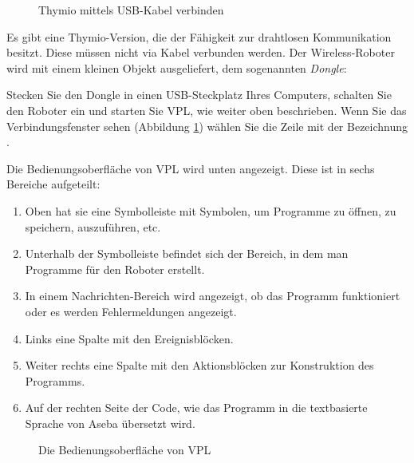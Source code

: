 
\begin{figure} 
\begin{center}
\caption{Thymio mittels USB-Kabel verbinden}\label{fig.connect}
\end{center}
\end{figure}


Es gibt eine Thymio-Version, die der Fähigkeit zur drahtlosen Kommunikation besitzt. Diese müssen nicht via Kabel verbunden werden. Der Wireless-Roboter wird mit einem kleinen Objekt ausgeliefert, dem sogenannten \emph{Dongle}:


Stecken Sie den Dongle in einen USB-Steckplatz Ihres Computers, schalten Sie den Roboter ein und starten Sie VPL, wie weiter oben beschrieben. Wenn Sie das Verbindungsfenster sehen (Abbildung \ref{fig.connect}) wählen Sie die Zeile mit der Bezeichnung .



Die Bedienungsoberfläche von VPL wird unten angezeigt. Diese ist in sechs
Bereiche aufgeteilt:
\begin{enumerate}
\item Oben hat sie eine Symbolleiste mit Symbolen, um Programme zu öffnen, zu speichern, auszuführen, etc.
\item Unterhalb der Symbolleiste befindet sich der Bereich, in dem man Programme für den Roboter erstellt.
\item  In einem Nachrichten-Bereich wird angezeigt, ob das Programm funktioniert oder es werden Fehlermeldungen angezeigt.
\item Links eine Spalte mit den Ereignisblöcken.
\item Weiter rechts eine Spalte mit den Aktionsblöcken zur Konstruktion des Programms.
\item Auf der rechten Seite der Code, wie das Programm in die textbasierte Sprache von Aseba übersetzt wird.
\end{enumerate}

\plainfloat
\begin{figure}[h]
\caption{Die Bedienungsoberfläche von VPL}\label{fig.vplgui}
\end{figure}
\framedfloat

